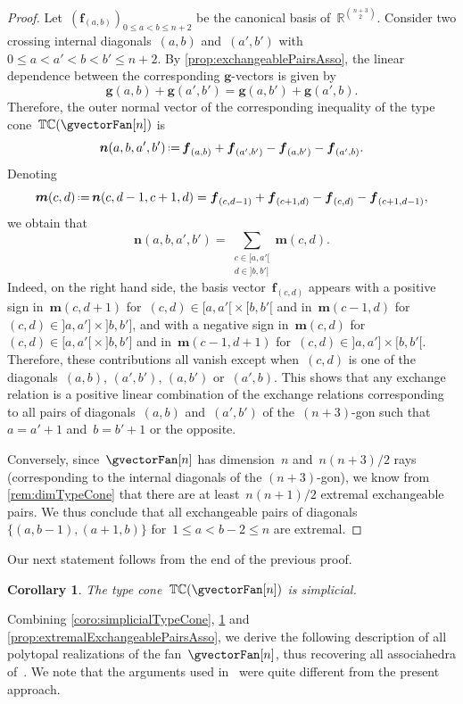 \documentclass{amsart}
\newtheorem{corollary}[theorem]{Corollary}
\theoremstyle{definition}
\newcommand{\R}{\mathbb{R}} %
\renewcommand{\b}[1]{{\boldsymbol{#1}}} %
\newcommand{\eqdef}{\mbox{\,\raisebox{0.2ex}{\scriptsize\ensuremath{\mathrm:}}\ensuremath{=}\,}} %
\newcommand{\gvector}[1]{\b{g}(#1)} %
\newcommand{\typeCone}{\mathbb{TC}} %
\begin{document}
\begin{proof}
Let~$(\b{f}_{(a,b)})_{0 \le a < b \le n+2}$ be the canonical basis of~$\R^{\binom{n+3}{2}}$.
Consider two crossing internal diagonals~$(a,b)$ and~$(a',b')$ with~$0 \le a < a' < b < b' \le n+2$.
By \cref{prop:exchangeablePairsAsso}, the linear dependence between the corresponding $\b{g}$-vectors is given by
\[
\gvector{a,b} + \gvector{a',b'} = \gvector{a,b'} + \gvector{a',b}.
\]
Therefore, the outer normal vector of the corresponding inequality of the type cone~$\typeCone(\gvectorFan[n])$ is
\[
\b{n}(a,b,a',b') \eqdef \b{f}_{(a,b)} + \b{f}_{(a',b')} - \b{f}_{(a,b')} - \b{f}_{(a',b)}.
\]
Denoting
\[
\b{m}(c,d) \eqdef \b{n}(c,d-1,c+1,d) = \b{f}_{(c,d-1)} + \b{f}_{(c+1,d)} - \b{f}_{(c,d)} - \b{f}_{(c+1,d-1)},
\]
we obtain that
\[
\b{n}(a,b,a',b') = \sum_{\substack{c \in {[a,a'[} \\ d \in {]b,b']}}} \b{m}(c,d).
\]
Indeed, on the right hand side, the basis vector~$\b{f}_{(c,d)}$ appears with a positive sign in~$\b{m}(c,d+1)$ for~$(c,d) \in {[a,a'[} \times {[b,b'[}$ and in~$\b{m}(c-1,d)$ for~$(c,d) \in {]a,a']} \times {]b,b']}$, and with a negative sign in~$\b{m}(c,d)$ for~$(c,d) \in {[a,a'[} \times {]b,b']}$ and in~$\b{m}(c-1,d+1)$ for~$(c,d) \in {]a,a']} \times {[b,b'[}$.
Therefore, these contributions all vanish except when~$(c,d)$ is one of the diagonals~$(a,b)$, $(a',b')$, $(a,b')$ or~$(a',b)$.
This shows that any exchange relation is a positive linear combination of the exchange relations corresponding to all pairs of diagonals~$(a,b)$ and~$(a',b')$ of the~$(n+3)$-gon such that~$a = a'+1$ and~$b = b'+1$ or the opposite.

Conversely, since~$\gvectorFan[n]$ has dimension~$n$ and~$n(n+3)/2$ rays (corresponding to the internal diagonals of the $(n+3)$-gon), we know from \cref{rem:dimTypeCone} that there are at least~$n(n+1)/2$ extremal exchangeable pairs. We thus conclude that all exchangeable pairs of diagonals~$\{(a,b-1), (a+1,b)\}$ for~$1 \le a < b-2 \le n$ are extremal.
\end{proof}

Our next statement follows from the end of the previous proof.

\begin{corollary}
\label{coro:simplicialTypeConeAsso}
The type cone~$\typeCone(\gvectorFan[n])$ is simplicial.
\end{corollary}

Combining \cref{coro:simplicialTypeCone}, \cref{coro:simplicialTypeConeAsso} and \cref{prop:extremalExchangeablePairsAsso}, we derive the following description of all polytopal realizations of the fan~$\gvectorFan[n]$, thus recovering all associahedra of~\cite[Sect.~3.2]{ArkaniHamedBaiHeYan}.
We note that the arguments used in~\cite[Sect.~3.2]{ArkaniHamedBaiHeYan} were quite different from the present approach.
\end{document}
